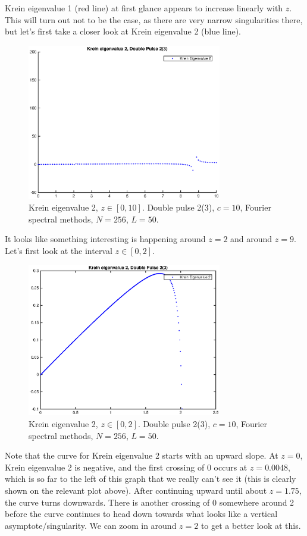 \documentclass[12pt]{article}
\begin{document}
Krein eigenvalue 1 (red line) at first glance appears to increase linearly with $z$. This will turn out not to be the case, as there are very narrow singularities there, but let's first take a closer look at Krein eigenvalue 2 (blue line). 

\begin{figure}[H]
	\includegraphics[width=8.5cm]{dp2kreineig4.eps}
	\caption{Krein eigenvalue 2, $z \in [0, 10]$. Double pulse 2(3), $c = 10$, Fourier spectral methods, $N =  256$, $L = 50$. }
\end{figure}

It looks like something interesting is happening around $z = 2$ and around $z = 9$. Let's first look at the interval $z \in [0, 2]$.

\begin{figure}[H]
	\includegraphics[width=8.5cm]{dp2kreineig0-2.eps}
	\caption{Krein eigenvalue 2, $z \in [0, 2]$. Double pulse 2(3), $c = 10$, Fourier spectral methods, $N =  256$, $L = 50$.}
\end{figure}

Note that the curve for Krein eigenvalue 2 starts with an upward slope. At $z = 0$, Krein eigenvalue 2 is negative, and the first crossing of 0 occurs at $z = 0.0048$, which is so far to the left of this graph that we really can't see it (this is clearly shown on the relevant plot above). After continuing upward until about $z = 1.75$, the curve turns downwards. There is another crossing of 0 somewhere around 2 before the curve continues to head down towards what looks like a vertical asymptote/singularity. We can zoom in around $z = 2$ to get a better look at this.
\end{document}
